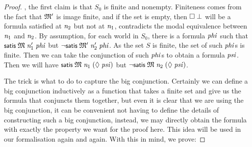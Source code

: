 \documentclass[letterpaper]{article}
\renewcommand{\HOLConst}[1]{{\textsf{\upshape\small #1}}}
\renewcommand{\HOLinline}[1]{\ensuremath{#1}}
\begin{document}
\begin{proof}
, the first claim is that $S_0$ is finite and nonempty. Finiteness comes from the fact that \HOLinline{\HOLFreeVar{\ensuremath{\mathfrak{M}'}}} is image finite, and if the set is empty, then \HOLinline{\HOLSymConst{\ensuremath{\Box}}\;\HOLSymConst{\ensuremath{\bot}}} will be a formula satisfied at \HOLinline{\HOLFreeVar{n\sb{\mathrm{2}}}} but not at \HOLinline{\HOLFreeVar{n\sb{\mathrm{1}}}}, contradicts the modal equivalence between \HOLinline{\HOLFreeVar{n\sb{\mathrm{1}}}} and \HOLinline{\HOLFreeVar{n\sb{\mathrm{2}}}}. By assumption, for each world in $S_0$, there is a formula \HOLinline{\HOLFreeVar{phi}} such that \HOLinline{\HOLConst{satis}\;\HOLFreeVar{\ensuremath{\mathfrak{M}}}\;\HOLFreeVar{n\sb{\mathrm{1}}\sp{\prime}}\;\HOLFreeVar{phi}} but \HOLinline{\HOLSymConst{\HOLTokenNeg{}}\HOLConst{satis}\;\HOLFreeVar{\ensuremath{\mathfrak{M}'}}\;\HOLFreeVar{n\sb{\mathrm{2}}\sp{\prime}}\;\HOLFreeVar{phi}}. As the set $S$ is finite, the set of such \HOLinline{\HOLFreeVar{phi}}s is finite. Then we can take the conjunction of such \HOLinline{\HOLFreeVar{phi}}s to obtain a formula \HOLinline{\HOLFreeVar{psi}}. Then we will have \HOLinline{\HOLConst{satis}\;\HOLFreeVar{\ensuremath{\mathfrak{M}}}\;\HOLFreeVar{n\sb{\mathrm{1}}}\;(\HOLSymConst{\ensuremath{\Diamond}}\;\HOLFreeVar{psi})} but \HOLinline{\HOLSymConst{\HOLTokenNeg{}}\HOLConst{satis}\;\HOLFreeVar{\ensuremath{\mathfrak{M}}}\;\HOLFreeVar{n\sb{\mathrm{2}}}\;(\HOLSymConst{\ensuremath{\Diamond}}\;\HOLFreeVar{psi})}.

The trick is what to do to capture the big conjunction. Certainly we can define a big conjunction inductively as a function that takes a finite set and give us the formula that conjuncts them together, but even it is clear that we are using the big conjunction, it can be convenient not having to define the details of constructing such a big conjunction, instead, we may directly obtain the formula with exactly the property we want for the proof here. This idea will be used in our formalisation again and again. With this in mind, we prove:


\end{proof}
\end{document}
